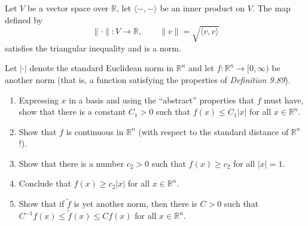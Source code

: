 
\begin{exercise}
\label{ex:inner_product_induced_norm}
Let $V$ be a vector space over $\mathbb{R}$, let $\langle -,-\rangle$ be an inner product on $V$.
The map defined by
$$\|\cdot\| : V \to \mathbb{R}, \qquad \|v\| = \sqrt{\langle v,v\rangle}$$
satisfies the triangular inequality and is a norm.
\end{exercise}


\begin{exercise}
\label{ex:norm_equivalence_rn}
Let $|\cdot|$ denote the standard Euclidean norm in $\mathbb{R}^n$ and let
$f : \mathbb{R}^n \to [0,\infty)$ be another norm (that is, a function satisfying the properties
of \textit{Definition 9.89}).
\begin{enumerate}[label=\textbf{(\alph*)}]
  \item Expressing $x$ in a basis and using the ``abstract'' properties that $f$ must have, show
    that there is a constant $C_1 > 0$ such that $f(x) \leq C_1|x|$ for all $x \in \mathbb{R}^n$.
  \item Show that $f$ is continuous in $\mathbb{R}^n$ (with respect to the standard distance of
    $\mathbb{R}^n$!).
  \item Show that there is a number $c_2 > 0$ such that $f(x) \geq c_2$ for all $|x| = 1$.
  \item Conclude that $f(x) \geq c_2|x|$ for all $x \in \mathbb{R}^n$.
  \item Show that if $\tilde f$ is yet another norm, then there is $C > 0$ such that
    $C^{-1}f(x) \leq \tilde f(x) \leq Cf(x)$ for all $x \in \mathbb{R}^n$.
\end{enumerate}
\end{exercise}

